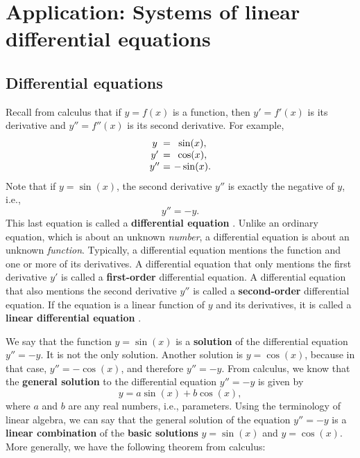 \section{Application: Systems of linear differential equations}

\subsection{Differential equations}

Recall from calculus that if $y=f(x)$ is a function, then $y' = f'(x)$
is its derivative%
 and $y'' = f''(x)$ is its second derivative.  For
example,
\begin{equation*}
  \begin{array}{c@{~}c@{~}c}
    y &=& \sin(x),\\
    y' &=& \cos(x),\\
    y''&=& -\sin(x).\\
  \end{array}
\end{equation*}
Note that if $y=\sin(x)$, the second derivative $y''$ is exactly the
negative of $y$, i.e.,
\begin{equation*}
  y'' = -y.
\end{equation*}
This last equation is called a \textbf{differential equation}%
%
. Unlike an ordinary equation, which is
about an unknown {\em number}, a differential equation is about an
unknown {\em function}. Typically, a differential equation mentions
the function and one or more of its derivatives. A differential
equation that only mentions the first derivative $y'$ is called a
\textbf{first-order}%
 differential equation. A
differential equation that also mentions the second derivative $y''$
is called a \textbf{second-order}%
 differential equation.
If the equation is a linear function of $y$ and its derivatives, it is
called a \textbf{linear differential equation}%
%
.

We say that the function $y=\sin(x)$ is a \textbf{solution}%
 of the differential equation
$y'' = -y$. It is not the only solution. Another solution is
$y=\cos(x)$, because in that case, $y''=-\cos(x)$, and therefore
$y''=-y$. From calculus, we know that the \textbf{general solution} to
the differential equation $y'' = -y$ is given by
\begin{equation*}
  y = a\sin(x) + b\cos(x),
\end{equation*}
where $a$ and $b$ are any real numbers, i.e., parameters. Using the
terminology of linear algebra, we can say that the general solution of
the equation $y'' = -y$ is a \textbf{linear combination}%
of the \textbf{basic solutions}%
%
 $y=\sin(x)$ and
$y=\cos(x)$. More generally, we have the following theorem from
calculus:

